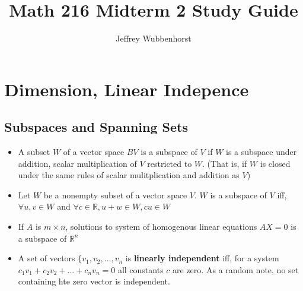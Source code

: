 \documentclass[10pt,letterpaper]{article}
\author{Jeffrey Wubbenhorst}
\title{Math 216 Midterm 2 Study Guide }
\begin{document}
\maketitle

\section*{Dimension, Linear Indepence} 
\subsection*{Subspaces and Spanning Sets }%
\begin{itemize}

\item A subset $W$ of a vector space $BV$ is a subspace of $V$ if $W$ is a subspace under addition, scalar multiplication of $V$ restricted to  $W$. (That is, if $W$ is closed under the same rules of scalar mulitplication and addition as $V$)

\item Let $W$ be a nonempty subset of a vector space $V$. $W$ is a subspace of $V$ iff, $\forall u, v \in W$ and $\forall c \in \mathbb{R}, u + w \in W, cu \in W$

\item If $A$ is $m\times n$, solutions to system of homogenous linear equations $AX=0$ is a subspace of $\mathbb{R}^n$

\item A set of vectors $\{v_1, v_2, ..., v_n$ is \textbf{linearly independent }iff, for a system $c_1v_1+c_2v_2+...+c_nv_n=0$ all constants $c$ are zero. As a random note, no set containing hte zero vector is independent. 

\end{itemize}
\end{document}
